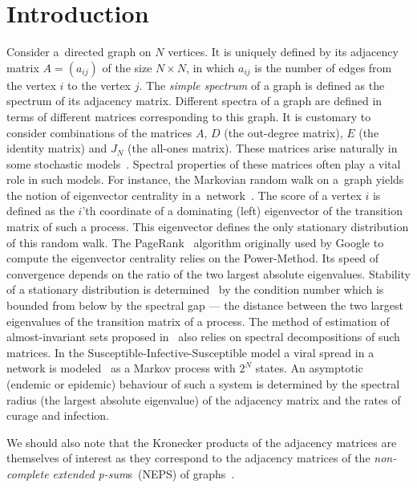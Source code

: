 \documentclass[a4paper]{jpconf}
\begin{document}
\section{Introduction}
Consider a~directed graph on \( N \) vertices.
It is uniquely defined by its
adjacency matrix
    \( A = (a_{ij}) \)
    of the size \( N\times N \),
    in which \( a_{ij} \)
    is the number of edges
    from the vertex \( i \)
    to the vertex \( j \).
The \emph{simple spectrum} of a graph
    is defined as the spectrum of its adjacency matrix.
Different spectra of a graph are defined in terms of different matrices
    corresponding to this graph.
It is customary to consider combinations
    of the matrices \( A \),
    \( D \) (the out-degree matrix),
    \( E \) (the identity matrix)
    and \( J_N \) (the all-ones matrix).
These matrices arise naturally
    in some stochastic models~\cite[p.~184]{cvetkovic2010introduction}.
Spectral  properties of these matrices
    often play a vital role in such models.
For instance, the Markovian random walk on a~graph
    yields the notion of eigenvector centrality
    in a~network~\cite{ilprints422,bonacich1972factoring}.
The score of a vertex \( i \)
    is defined as the \( i \)'th coordinate
    of a dominating (left) eigenvector
    of the transition matrix of such a process.
This eigenvector
    defines the only stationary distribution
    of this random walk.
The PageRank~\cite{ilprints422} algorithm
    originally used by Google
    to compute the eigenvector centrality
    relies on the Power-Method.
Its speed of convergence depends on
    the ratio of the two largest absolute eigenvalues.
Stability of a stationary distribution
    is determined~\cite{meyer1994sensitivity}
    by the condition number
    which is bounded from below
    by the spectral gap --- the distance between
    the two largest eigenvalues
    of the transition matrix of a process.
The method of estimation of almost-invariant sets
    proposed in~\cite{schwartz2006fluctuation}
    also relies on spectral decompositions of such matrices.
In the Susceptible-Infective-Susceptible model
    a viral spread in a network
    is modeled~\cite{wang2003epidemic,chakrabarti2008epidemic} as a Markov process
    with \( 2^N \) states.
An asymptotic (endemic or epidemic) behaviour of such a system
    is determined by the spectral radius (the largest absolute eigenvalue)
    of the adjacency matrix
    and the rates of curage and infection.

We should also note that the Kronecker products
    of the adjacency matrices
    are themselves of interest
    as they correspond to the adjacency matrices of
    the \emph{non-complete extended p-sum}s~(NEPS)
    of graphs~\cite[p.~44]{cvetkovic2010introduction}.
\end{document}

